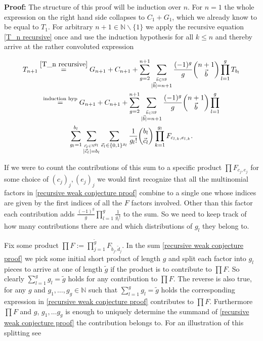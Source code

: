 \documentclass[b5paper,draft,openbib,12pt]{memoir}
\begin{document}
\textbf{Proof:} The structure of this proof will be induction over \(n\). For \(n=1\) the whole expression
on the right hand side collapses to \(C_1 + G_1\), which we already know to be equal to \(T_1\). For
arbitrary \(n+1\in\mathbb{N}\backslash\{1\}\) we apply the recursive equation \eqref{T_n recursive}
once and use the induction hypothesis for all \(k\le n\) and thereby arrive at the rather convoluted 
expression

\begin{multline}\label{recursive weak conjecture proof}
T_{n+1} \stackrel{\eqref{T_n recursive}}{=} 
G_{n+1} + C_{n+1}+ \sum_{g=2}^{n+1} \sum_{\stackrel{\vec{b}\in\mathbb{N}^g}{|\vec{b}|=n+1}} 
\frac{(-1)^g}{g} \binom{n+1}{\vec{b}} \prod_{l=1}^g T_{b_l}\\
\stackrel{\text{induction hyp}}{=} G_{n+1} + C_{n+1}+ \sum_{g=2}^{n+1} \sum_{\stackrel{\vec{b}\in\mathbb{N}^g}{|\vec{b}|=n+1}} 
\frac{(-1)^g}{g} \binom{n+1}{\vec{b}} \prod_{l=1}^g \\
\sum_{g_l=1}^{b_l} \sum_{\stackrel{\vec{c}_l \in\mathbb{N}^{g_l}}{|\vec{c}_l|=b_l}} \sum_{\vec{e}_l \in \{0,1\}^{g_l}}
\frac{1}{g_l!} \binom{b_l}{\vec{c}_l} \prod_{k=1}^{g_l} F_{c_{l,k},e_{l,k}}.
\end{multline}

If we were to count the contributions of this sum to a specific product \(\prod F_{c_j,e_j}\) for some choice of 
\((c_j)_j, (e_j)_j\) we would first recognize that all the multinomial factors in \eqref{recursive weak conjecture proof}
combine to a single one whose indices are given by the first indices of all the \(F\) factors involved.
Other than this factor each contribution adds \(\frac{(-1)^g}{g} \prod_{l=1}^g \frac{1}{g_l!}\) to the sum. So we 
need to keep track of how many contributions there are and which distributions of \(g_l\) they belong to. 

Fix some product \(\prod F :=\prod_{j=1}^{\tilde{g}} F_{\tilde{b}_j,\tilde{d}_j}\). In the sum 
\eqref{recursive weak conjecture proof} we pick some initial short product of length \(g\) and split each
factor into \(g_l\) pieces to arrive at one of length \(\tilde{g}\) if the product is to contribute to
\(\prod F\). So clearly \(\sum_{l=1}^g g_l = \tilde{g}\) holds for any contribution to \(\prod F\). 
The reverse is also true, for any
\(g\) and \(g_1, \dots, g_g\in\mathbb{N}\) such that \(\sum_{l=1}^g g_l=\tilde{g}\) holds
the corresponding expression in \eqref{recursive weak conjecture proof} contributes to 
\(\prod F\). Furthermore \(\prod F\) and \(g\), \(g_1,\dots g_g\) is enough to uniquely
determine the summand of \eqref{recursive weak conjecture proof} the contribution
belongs to. For an illustration of this splitting see
\end{document}
